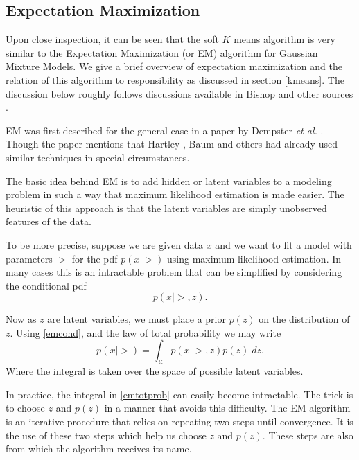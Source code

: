 
\subsection{Expectation Maximization} \label{emAlg}
Upon close inspection, it can be seen that the soft \(K\) means algorithm is 
very similar to the Expectation Maximization (or EM) algorithm for Gaussian 
Mixture Models.  We give a brief overview of expectation maximization
and the relation of this algorithm to responsibility as discussed in section 
\ref{kmeans}. The discussion below roughly follows discussions available in 
Bishop and other sources \cite{MML_2019, BishopBook, hastie09esl}.

EM was first described for the general case in a paper by Dempster \textit{et al.} \cite{Dempster77EM}.  
Though the paper mentions that Hartley \cite{hartley1958}, Baum \cite{baum1970} and others \cite{woodbury1970missing,sundberg1974,sundberg1976}
had already used similar techniques in special circumstances.

The basic idea behind EM is to add hidden or latent variables to a modeling
problem in such a way that maximum likelihood estimation is made easier.  The 
heuristic of this approach is that the latent variables are simply unobserved 
features of the data.  

To be more precise, suppose we are given data $ x $ and we want to fit a model 
with parameters $ \gt $ for the pdf \( p(x|\gt) \) using maximum likelihood 
estimation. In many cases this is an intractable problem that can be simplified
by considering the conditional pdf
\begin{equation}\label{emcond}	
p(x|\gt,z).
\end{equation}

Now as \( z \) are latent variables, we must place a prior \( p(z) \) on the 
distribution of \( z. \) Using \ref{emcond}, and the law of total probability 
we may write
\begin{equation}\label{emtotprob}
p(x|\gt)=\int_{\mathcal{Z}} p(x|\gt,z)p(z)\;dz.
\end{equation}
Where the integral is taken over the space of possible latent variables.

In practice, the integral in \ref{emtotprob} can easily become intractable.  The trick is
to choose \( z \) and \( p(z) \) in a manner that avoids this difficulty. 
The EM algorithm is an iterative procedure that relies on repeating two steps until convergence.  It is the use of these two steps which help us choose \( z \) and \( p(z) \). These steps are also from which the algorithm receives its name.  

